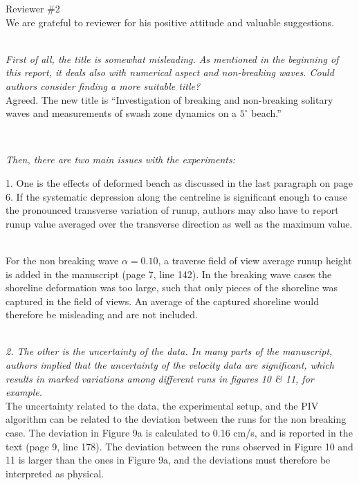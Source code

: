 \documentclass[11pt]{article}
\begin{document}
\newcommand{\refpoint}[1]{\ \vspace{0.3cm}\\ {\em #1}\  \vspace{0.3cm}\\ }
\newcommand{\todo}[1]{\ \\ {\bf To do: #1}}

Reviewer \#2
\\
We are grateful to reviewer for his positive attitude and valuable suggestions.

\refpoint{First of all, the title is somewhat misleading. As mentioned in the beginning of this report, it deals also with 
numerical aspect and non-breaking waves. Could authors consider finding a more suitable title?}
Agreed.
The new title is ``Investigation of breaking and non-breaking solitary waves and measurements of swash zone dynamics on 
a $5^\circ$ beach.''



\refpoint{Then, there are two main issues with the experiments: 

1. One is the effects of deformed beach as discussed in the last paragraph on page 6. If the systematic depression along the centreline is significant enough to cause the pronounced transverse variation of runup, authors may also have to report runup value averaged over the transverse direction as well as the maximum value.}

For the non breaking wave $\alpha =0.10$, a traverse field of view average runup height is added in the manuscript (page 7, line 142). In the breaking wave cases the shoreline deformation was too large, such that only pieces of the shoreline was captured in the field of views. An average of the captured shoreline would therefore be misleading and are not included. 

\refpoint{2. The other is the uncertainty of the data. In many parts of the manuscript, authors implied that the uncertainty of the velocity data are significant, which results in marked variations among different runs in figures 10 \& 11, for example.}

The uncertainty related to the data, the experimental setup, and the PIV algorithm can be related to the deviation between the runs for the non breaking case. The deviation in Figure 9a is calculated to 0.16 cm/s, and is reported in the text (page 9, line 178). The deviation between the runs observed in Figure 10 and 11 is larger than the ones in Figure 9a, and the deviations must therefore be interpreted as physical.
\end{document}
